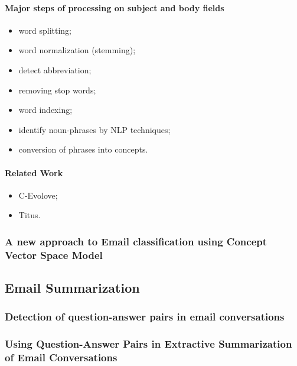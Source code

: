 \documentclass[12pt]{article}
\begin{document}
\paragraph{Major steps of processing on subject and body fields}
\begin{itemize}
    \item word splitting;
    \item word normalization (stemming);
    \item detect abbreviation;
    \item removing stop words;
    \item word indexing;
    \item identify noun-phrases by NLP techniques;
    \item conversion of phrases into concepts.
\end{itemize}

\paragraph{Related Work}
\begin{itemize}
    \item C-Evolove;
    \item Titus.
\end{itemize}


\subsubsection{A new approach to Email classification using Concept Vector Space Model}




\subsection{Email Summarization}
\subsubsection{Detection of question-answer pairs in email conversations \cite{LOKESH04}}


\subsubsection{Using Question-Answer Pairs in Extractive Summarization of Email Conversations \cite{KATHLEEN07}}
\end{document}
